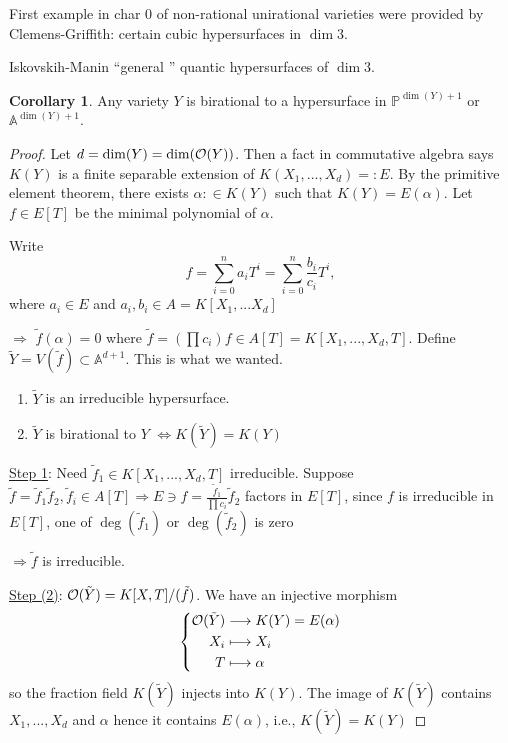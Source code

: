 \documentclass[11pt]{article}
\theoremstyle{definition}
\newtheorem{cor}[thm]{Corollary}
\newcommand{\affn}{\mathbb A}
\newcommand{\proj}{\mathbb P}
\newcommand{\calo}{{\cal O}}
\newcommand{\Lrta}{\Longrightarrow}
\newcommand{\lrta}{\longrightarrow}
\newcommand{\Llrta}{\Longleftrightarrow}
\begin{document}
First example in char $0$ of non-rational unirational varieties were provided by Clemens-Griffith: certain cubic hypersurfaces in $\dim 3$. 

Iskovskih-Manin ``general '' quantic hypersurfaces of $\dim 3$.

\begin{cor}
Any variety $Y$ is birational to a hypersurface in $\proj^{\dim(Y)+1}$ or $\affn^{\dim(Y)+1}$.
\end{cor}
\begin{proof}
Let $d=\dim(Y)=\dim(\calo(Y))$. Then a fact in commutative algebra says $K(Y)$ is a finite separable extension of $K(X_1,...,X_d)=:E$. By the primitive element theorem, there exists $\alpha:\in K(Y)$ such that  $K(Y)=E(\alpha)$. Let $f\in E[T]$ be the minimal polynomial of $\alpha$.

Write
$$
f=\sum_{i=0}^na_i T^i=\sum_{i=0}^n \frac{b_i}{c_i} T^i,
$$
where $a_i\in E$ and $a_i, b_i\in A=K[X_1,...X_d]$

$\Lrta$ $\tilde{f}(\alpha)=0$ where $\tilde{f}=\left(\prod c_i\right)f\in A[T]=K[X_1,...,X_d,T]$. Define $\tilde{Y}=V(\tilde{f})\subset \affn^{d+1}$. This is what we wanted.
\begin{enumerate}[label=(\arabic*)]
\item $\tilde{Y}$ is an irreducible hypersurface.
\item $\tilde{Y}$ is birational to $Y$ $\Llrta K(\tilde{Y})=K(Y)$
\end{enumerate}

\underline{Step 1}: Need $\tilde{f}_1\in K[X_1,...,X_d,T]$ irreducible. Suppose $\tilde{f}=\tilde{f}_1\tilde{f}_2, \tilde{f}_i\in A[T]\Lrta E\ni f=\frac{\tilde{f}_1}{\prod c_i}\tilde{f}_2 $ factors in $E[T]$, since $f$ is irreducible in  $E[T]$, one of $\deg(\tilde{f}_1)$ or $\deg(\tilde{f}_2)$ is zero

$\Lrta \tilde{f}$ is irreducible.

\underline{Step (2)}: $\calo(\tilde{Y})=K[X,T]/(\tilde{f})$. We have an injective morphism
$$
\left\{\begin{aligned}
 \calo(\tilde{Y})&\lrta K(Y)=E(\alpha)\\
 X_i&\longmapsto X_i\\
 T&\longmapsto \alpha
\end{aligned}
\right.
$$
so the fraction field $K(\tilde{Y})$ injects into $K(Y)$. The image of $K(\tilde{Y})$ contains $X_1,...,X_d$ and $\alpha$ hence it contains $E(\alpha)$, i.e., $K(\tilde{Y})=K(Y)$
\end{proof}
\end{document}
